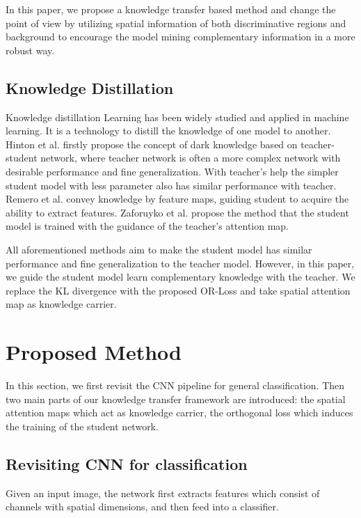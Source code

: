 \documentclass{article}
\begin{document}
In this paper, we propose a knowledge transfer based method and change the point of view by utilizing spatial information of both discriminative regions and background to encourage the model mining complementary information in a more robust way.

\subsection{Knowledge Distillation} Knowledge distillation Learning has been widely studied and applied in machine learning. It is a technology to distill the knowledge of one model to another. Hinton et al. \cite{hinton2015distilling} firstly propose the concept of dark knowledge based on teacher-student network, where teacher network is often a more complex network with desirable performance and fine generalization. With teacher's help the simpler student model with less parameter also has similar performance with teacher. Remero et al. \cite{romero2015fitnets} convey knowledge by feature maps, guiding student to acquire the ability to extract features. Zaforuyko et al. \cite{zagoruyko2017paying} propose the method that the student model is trained with the guidance of the teacher's attention map.

All aforementioned methods aim to make the student model has similar performance and fine generalization to the teacher model. However, in this paper, we guide the student model learn complementary knowledge with the teacher. We replace the KL divergence with the proposed OR-Loss and take spatial attention map as knowledge carrier. 


\section{Proposed Method}

In this section, we first revisit the CNN pipeline for general classification. Then two main parts of our knowledge transfer framework are introduced: the spatial attention maps which act as knowledge carrier, the orthogonal loss which induces the training of the student network.


\subsection{Revisiting CNN for classification}
Given an input image, the network first extracts features  which consist of  channels with  spatial dimensions, and then feed into a classifier.
\end{document}
